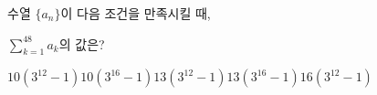 \hspace*{2mm}\begin{minipage}[t]{\dimexpr\linewidth-2mm\relax}\vspace{0pt}
수열 $\{a_n\}$이 다음 조건을 만족시킬 때,\par\noindent $\displaystyle\sum_{k=1}^{48} a_k$의 값은? 
\begin{choices32}{$10(3^{12}-1)$}{$10(3^{16}-1)$}{$13(3^{12}-1)$}{$13(3^{16}-1)$}{$16(3^{12}-1)$}\end{choices32}\end{minipage}
